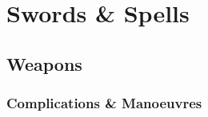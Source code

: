 \chapter{Swords \& Spells}
\label{combatAppendix}

\begin{multicols}{2}

\initiativechart

\armourchart

\end{multicols}

\chasechart

\huntchart

\section*{Weapons}

\improvisedWeaponsChart

\weaponsChart

\esotericWeaponsChart

\pagebreak

\subsection{Complications \& Manoeuvres}


\printindex[spells]

\pagebreak

\printindex

